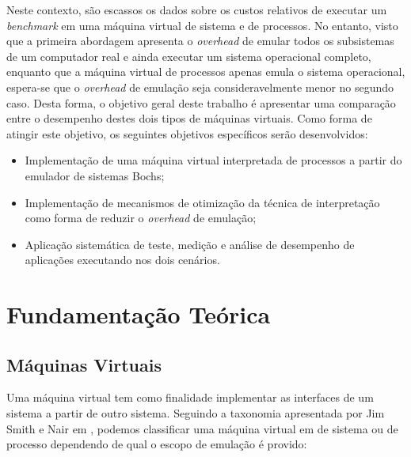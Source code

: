 \documentclass[11pt,twoside]{article}
\begin{document}

Neste contexto, são escassos os dados sobre os custos relativos de executar um \textit{benchmark} em uma máquina virtual de sistema e de processos. 
No entanto, visto que a primeira abordagem apresenta o \textit{overhead} de emular todos os subsistemas de um computador real e ainda executar um sistema operacional completo, enquanto que a máquina virtual de processos apenas emula o sistema operacional, espera-se que o \textit{overhead} de emulação seja consideravelmente menor no segundo caso.
Desta forma, o objetivo geral deste trabalho é apresentar uma comparação entre o desempenho destes dois tipos de máquinas virtuais.
Como forma de atingir este objetivo, os seguintes objetivos específicos serão desenvolvidos:

\begin{itemize}
 \item Implementação de uma máquina virtual interpretada de processos a partir do emulador de sistemas Bochs;
 \item Implementação de mecanismos de otimização da técnica de interpretação como forma de reduzir o \textit{overhead} de emulação;
 \item Aplicação sistemática de teste, medição e análise de desempenho de aplicações executando nos dois cenários.
\end{itemize} 







\section{Fundamentação Teórica} \label{sec:fundamentacao}

\subsection{Máquinas Virtuais}

Uma máquina virtual tem como finalidade implementar as interfaces de um sistema a partir de outro sistema.
Seguindo a taxonomia apresentada por Jim Smith e Nair em \cite{Smith2005}, podemos classificar uma máquina
virtual em de sistema ou de processo dependendo de qual o escopo de emulação é provido:
\end{document}
